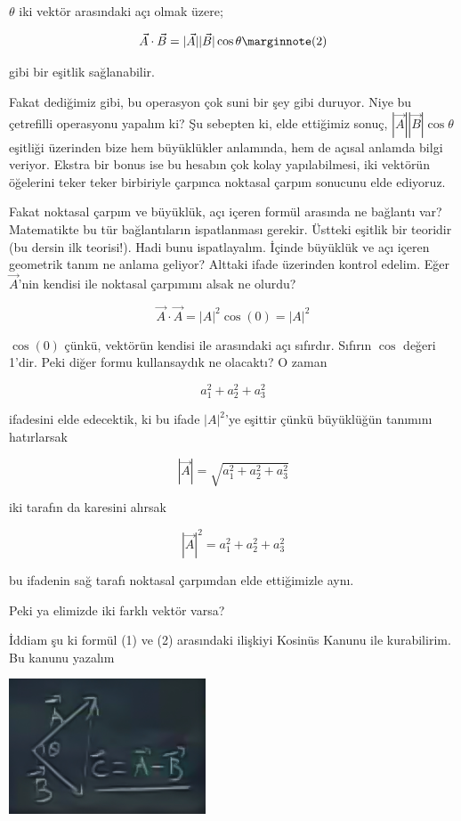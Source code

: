 \documentclass[12pt,fleqn]{article}\usepackage{../../common}
\begin{document}
$\theta$ iki vektör arasındaki açı olmak üzere;

$$
\vec{A} \cdot \vec{B} = |\vec{A}||\vec{B}| \cos \theta 
\mlabel{2}
$$

gibi bir eşitlik sağlanabilir.

Fakat dediğimiz gibi, bu operasyon çok suni bir şey gibi duruyor. Niye bu
çetrefilli operasyonu yapalım ki? Şu sebepten ki, elde ettiğimiz sonuç,
$|\vec{A}||\vec{B}| \cos \theta $ eşitliği üzerinden bize hem büyüklükler
anlamında, hem de açısal anlamda bilgi veriyor. Ekstra bir bonus ise bu hesabın
çok kolay yapılabilmesi, iki vektörün öğelerini teker teker birbiriyle çarpınca
noktasal çarpım sonucunu elde ediyoruz.

Fakat noktasal çarpım ve büyüklük, açı içeren formül arasında ne bağlantı var?
Matematikte bu tür bağlantıların ispatlanması gerekir. Üstteki eşitlik bir
teoridir (bu dersin ilk teorisi!). Hadi bunu ispatlayalım. İçinde büyüklük ve
açı içeren geometrik tanım ne anlama geliyor? Alttaki ifade üzerinden kontrol
edelim. Eğer $\vec{A}$'nin kendisi ile noktasal çarpımını alsak ne olurdu?

$$\vec{A} \cdot \vec{A} = |A|^2\cos(0) = |A|^2$$

$\cos(0)$ çünkü, vektörün kendisi ile arasındaki açı sıfırdır. Sıfırın $\cos$
değeri 1'dir. Peki diğer formu kullansaydık ne olacaktı? O zaman

$$ a_1^2 + a_2^2 + a_3^2 $$

ifadesini elde edecektik, ki bu ifade $|A|^2$'ye eşittir çünkü büyüklüğün
tanımını hatırlarsak

$$ |\vec{A}| = \sqrt{a_1 ^2 + a_2^2 + a_3^2} $$

iki tarafın da karesini alırsak

$$ |\vec{A}|^2 = a_1 ^2 + a_2^2 + a_3^2$$

bu ifadenin sağ tarafı noktasal çarpımdan elde ettiğimizle aynı. 

Peki ya elimizde iki farklı vektör varsa? 

İddiam şu ki formül (1) ve (2) arasındaki ilişkiyi Kosinüs Kanunu ile
kurabilirim. Bu kanunu yazalım

\includegraphics[height=4cm]{1_11.png}
\end{document}
